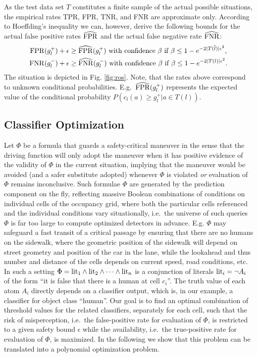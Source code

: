 As the test data set $T$ constitutes a finite sample of the actual possible situations, the empirical rates TPR, FPR, TNR, and FNR are approximate only. According to Hoeffding's inequality we can, however, derive the following bounds for the actual false positive rates $\widehat{\mathrm{FPR}}$ and the actual false negative rate $\widehat{\mathrm{FNR}}$:
\begin{gather*}
    \mathrm{FPR}(g_l^+) + \epsilon \geq \widehat{\mathrm{FPR}}(g_l^+) 
    \text{ with confidence $\beta$ if } \beta \leq 1 - e^{-2|T(\overline l)|\epsilon^2}\text,\\
    \mathrm{FNR}(g_l^-) + \epsilon \geq \widehat{\mathrm{FNR}}(g_l^-)
    \text{ with confidence $\beta$ if } \beta \leq 1 - e^{-2|T(l)|\epsilon^2}\text.
\end{gather*}
The situation is depicted in Fig. \ref{fig:ros}. Note, that the rates above correspond to unknown conditional probabilities. E.g.\
$\widehat{\mathrm{FPR}}(g_l^+)$ represents the expected value of the conditional probability $P( c_l(a)\geq g_l^+ | a\in T(l))$.

\subsection{Classifier Optimization}
Let $\Phi$ be a formula that guards a safety-critical maneuver in the sense that the driving function will only adopt the maneuver when it has positive evidence of the validity of $\Phi$ in the current situation, implying that the maneuver would be avoided (and a safer substitute adopted) whenever $\Phi$ is violated \emph{or} evaluation of $\Phi$ remains inconclusive. 
Such formulae $\Phi$ are generated by the prediction component on the fly, reflecting massive Boolean combinations of conditions on individual cells of the occupancy grid, where both the particular cells referenced and the individual conditions vary situationally, i.e.\ the universe of such queries $\Phi$ is far too large to compute optimized detectors in advance.
E.g. $\Phi$ may safeguard a fast transit of a critical passage by ensuring that there are no humans on the sidewalk, where the geometric position of the sidewalk will depend on street geometry and position of the car in the lane, while the lookahead and thus number and distance of the cells depends on current speed, road conditions, etc. In such a setting $\Phi = \mathrm{lit}_1 \land \mathrm{lit}_2 \land \dots \land \mathrm{lit}_n$ is a conjunction of literals $\mathrm{lit}_i=\lnot A_i$ of the form ``it is false that there is a human at cell $c_i$''. The truth value of each atom $A_i$ directly depends on a classifier output, which is, in our example, a classifier for object class ``human''. Our goal is to find an optimal combination of threshold values for the related classifiers, separately for each cell,
such that the risk of misperception, i.e.\ the false-positive rate for evaluation of $\Phi$, is restricted to a given safety bound
$\epsilon$ while the availability, i.e.\ the true-positive rate for evaluation of $\Phi$, is maximized. In the following we show that
this problem can be translated into a polynomial optimization problem.

